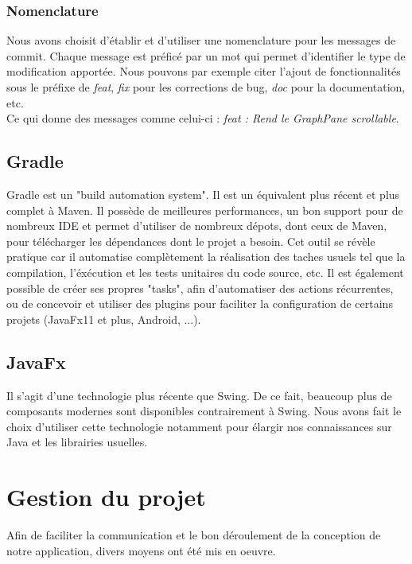 			\subsubsection{Nomenclature}

				Nous avons choisit d'établir et d'utiliser une nomenclature pour les messages de commit. Chaque message est préficé par un mot qui permet d'identifier le type de modification apportée. Nous pouvons par exemple citer l'ajout de fonctionnalités sous le préfixe de \textit{feat}, \textit{fix} pour les corrections de bug, \textit{doc} pour la documentation, etc.\\
				Ce qui donne des messages comme celui-ci : \textit{feat : Rend le GraphPane scrollable}.

		\subsection{Gradle}

			Gradle est un "build automation system". Il est un équivalent plus récent et plus complet à Maven. Il possède de meilleures performances, un bon support pour de nombreux IDE et permet d'utiliser de nombreux dépots, dont ceux de Maven, pour télécharger les dépendances dont le projet a besoin. Cet outil se révèle pratique car il automatise complètement la réalisation des taches usuels tel que la compilation, l'éxécution et les tests unitaires du code source, etc. Il est également possible de créer ses propres "tasks", afin d'automatiser des actions récurrentes, ou de concevoir et utiliser des plugins pour faciliter la configuration de certains projets (JavaFx11 et plus, Android, ...).

		\subsection{JavaFx}

			Il s'agit d'une technologie plus récente que Swing. De ce fait, beaucoup plus de composants modernes sont disponibles contrairement à Swing. Nous avons fait le choix d'utiliser cette technologie notamment pour élargir nos connaissances sur Java et les librairies usuelles. 

	\section{Gestion du projet}

		Afin de faciliter la communication et le bon déroulement de la conception de notre application, divers moyens ont été mis en oeuvre.

